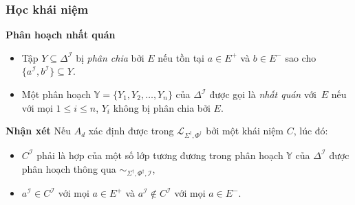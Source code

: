 \documentclass[notheorems,xcolor=dvipsnames]{beamer}
\newcommand{\mL}		{\mathcal{L}}
\newcommand{\mI}		{\mathcal{I}}
\newcommand{\mbY}		{\mathbb{Y}}
\newcommand{\SigmaDag}	{\Sigma^\dag}
\newcommand{\mLSPD}		{\mL_{\Sigma^\dag,\Phi^\dag}}
\newcommand{\simSdPdI}	{\sim_{\SigmaDag,\Phi^\dag,\mI}}
\begin{document}
\begin{frame}\frametitle{\bf Học khái niệm}
	\begin{block}{\bf Phân hoạch nhất quán}
		\begin{itemize}
			\setlength{\itemsep}{1.5ex}
			\item Tập $Y \subseteq \Delta^\mI$ bị {\em phân chia} bởi $E$ nếu tồn tại $a \in E^+$ và $b \in E^-$ sao cho $\{a^\mI, b^\mI\} \subseteq Y$. 
			
			\item Một phân hoạch $\mbY = \{Y_1, Y_2, \ldots, Y_n\}$ của $\Delta^\mI$ được gọi là {\em nhất quán} với~$E$ nếu với mọi $1 \leq i \leq n$, $Y_i$ không bị phân chia bởi $E$.
		\end{itemize}
	\end{block}
	
	\begin{block}{\bf Nhận xét}
		Nếu $A_d$ xác định được trong $\mLSPD$ bởi một khái niệm $C$, lúc đó:
		
		\begin{itemize}
			\setlength{\itemsep}{1.5ex}
			\item $C^\mI$ phải là hợp của một số lớp tương đương trong phân hoạch $\mbY$ của $\Delta^\mI$ được phân hoạch thông qua $\simSdPdI$,
			
			\item $a^\mI \in C^\mI$ với mọi $a \in E^+$ và $a^\mI \notin C^\mI$ với mọi $a \in E^-$.
		\end{itemize}
	\end{block}
\end{frame}
\end{document}
